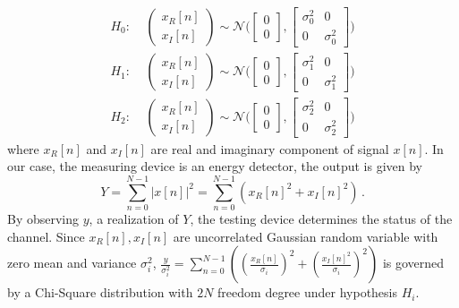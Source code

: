 \begin{equation}
   \begin{split}
  H_0:\;\;\;\;\begin{pmatrix} x_R[n] \\ x_I[n] \end{pmatrix} \sim \mathcal{N}\Big( \begin{bmatrix} 0 \\ 0 \end{bmatrix}, \begin{bmatrix} \sigma_0^2 & 0\\ 0 & \sigma_0^2 \end{bmatrix} \Big)\\
  H_1:\;\;\;\;\begin{pmatrix} x_R[n] \\ x_I[n] \end{pmatrix} \sim \mathcal{N}\Big( \begin{bmatrix} 0 \\ 0 \end{bmatrix}, \begin{bmatrix} \sigma_1^2 & 0\\ 0 & \sigma_1^2 \end{bmatrix} \Big)\\
  H_2:\;\;\;\;\begin{pmatrix} x_R[n] \\ x_I[n] \end{pmatrix} \sim \mathcal{N}\Big( \begin{bmatrix} 0 \\ 0 \end{bmatrix}, \begin{bmatrix} \sigma_2^2 & 0\\ 0 & \sigma_2^2 \end{bmatrix} \Big)
\end{split}
  \label{equ:xdistribution}
\end{equation}
where $x_R[n]$ and $x_I[n]$ are real and imaginary component of signal $x[n]$.
In our case, the measuring device is an energy detector, the output is given by
\begin{equation} 
  Y = \sum_{n=0}^{N-1}|x[n]|^2 = \sum_{n=0}^{N-1}(x_R[n]^2+x_I[n]^2)\,.
  \label{equ: testing device}
\end{equation}
By observing $y$, a realization of $Y$, the testing device determines the status of the channel. 
Since $x_R[n], x_I[n]$ are uncorrelated Gaussian random variable with zero mean and variance $\sigma_i^2$, $\frac{y}{\sigma_i^2} = \sum_{n=0}^{N-1}((\frac{x_R[n]}{\sigma_i})^2 + (\frac{x_I[n]^2}{\sigma_i})^2)$ is governed by a Chi-Square distribution with $2N$ freedom degree under hypothesis $H_i$.
